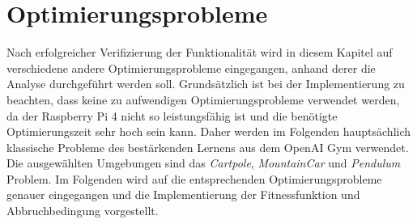 \section{Optimierungsprobleme}
\label{sec:analysis_optimzation_problems}
Nach erfolgreicher Verifizierung der Funktionalität wird in diesem Kapitel auf verschiedene andere Optimierungsprobleme eingegangen, anhand derer die Analyse durchgeführt werden soll. Grundsätzlich ist bei der Implementierung zu beachten, dass keine zu aufwendigen Optimierungsprobleme verwendet werden, da der Raspberry Pi 4 nicht so leistungsfähig ist und die benötigte Optimierungszeit sehr hoch sein kann. Daher werden im Folgenden hauptsächlich klassische Probleme des bestärkenden Lernens aus dem OpenAI Gym verwendet. Die ausgewählten Umgebungen sind das \emph{Cartpole}, \emph{MountainCar} und \emph{Pendulum} Problem. Im Folgenden wird auf die entsprechenden Optimierungsprobleme genauer eingegangen und die Implementierung der Fitnessfunktion und Abbruchbedingung vorgestellt. 

